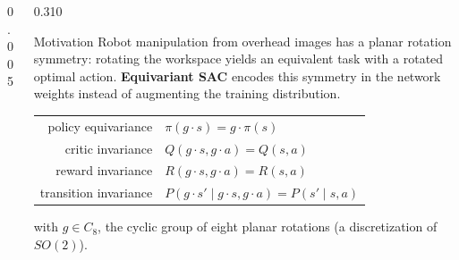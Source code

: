 \documentclass[final]{beamer}
\title{}
\author{}
\newcommand{\gact}{g\!\cdot\!}
\begin{document}
\begin{frame}[t]
\vspace*{-0.80cm}

\begin{columns}[t,totalwidth=\textwidth]

\begin{column}{0.005\textwidth}\end{column}

\begin{column}{0.310\textwidth}
\vspace{0pt}

\begin{block}{Motivation}
Robot manipulation from overhead images has a planar rotation symmetry: rotating the workspace yields an equivalent task with a rotated optimal action. \textbf{Equivariant SAC} encodes this symmetry in the network weights instead of augmenting the training distribution.
\vspace{0.10cm}
\begin{center}\small
\begin{tabular}{@{}rl@{}}
policy equivariance   & $\pi(\gact s) = \gact\pi(s)$ \\[0.10em]
critic invariance     & $Q(\gact s,\gact a) = Q(s,a)$ \\[0.10em]
reward invariance     & $R(\gact s,\gact a) = R(s,a)$ \\[0.10em]
transition invariance & $P(\gact s'\!\mid\!\gact s,\gact a) = P(s'\!\mid\!s,a)$ \\
\end{tabular}
\end{center}
\vspace{0.04cm}
with $g \in C_{8}$, the cyclic group of eight planar rotations (a discretization of $SO(2)$).
\end{block}


\end{column}
\end{columns}
\end{frame}
\end{document}

